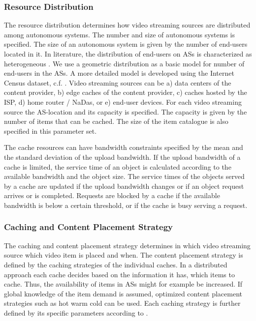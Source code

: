 \subsubsection{Resource Distribution}
The resource distribution determines how video streaming sources are distributed among autonomous systems.
The number and size of autonomous systems is specified.
The size of an autonomous system is given by the number of end-users located in it.
In literature, the distribution of end-users on ASs is characterized as heterogeneous \cite{Hossfeld2011}.
We use a geometric distribution as a basic model for number of end-users in the ASs.
A more detailed model is developed using the Internet Census dataset, c.f. .
Video streaming sources can be a) data centers of the content provider, b) edge caches of the content provider, c) caches hosted by the ISP, d) home router / NaDas, or e) end-user devices.
For each video streaming source the AS-location and its capacity is specified.
The capacity is given by the number of items that can be cached.
The size of the item catalogue is also specified in this parameter set.

The cache resources can have bandwidth constraints specified by the mean and the standard deviation of the upload bandwidth.
If the upload bandwidth of a cache is limited, the service time of an object is calculated according to the available bandwidth and the object size.
The service times of the objects served by a cache are updated if the upload bandwidth changes or if an object request arrives or is completed.
Requests are blocked by a cache if the available bandwidth is below a certain threshold, or if the cache is busy serving a request.

\subsubsection{Caching and Content Placement Strategy}
The caching and content placement strategy determines in which video streaming source which video item is placed and when.
The content placement strategy is defined by the caching strategies of the individual caches.
In a distributed approach each cache decides based on the information it has, which items to cache.
Thus, the availability of items in ASs might for example be increased.
If global knowledge of the item demand is assumed, optimized content placement strategies such as hot warm cold can be used.
Each caching strategy is further defined by its specific parameters according to .

